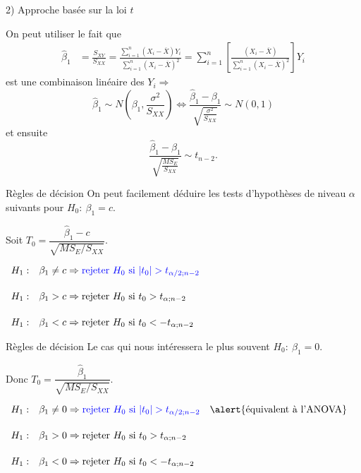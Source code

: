 \documentclass{BeamerTemplate}
\begin{document}
\begin{frame}[t]{2) Approche basée sur la loi $t$}

{\small
On peut utiliser le fait que
\begin{align*}
\hat{\beta}_1&=\frac{S_{XY}}{S_{XX}}=\frac{\sum_{i=1}^n(X_i-\overline{X})Y_i}{\sum_{i=1}^n(X_i-\overline{X})^2}
=\sum_{i=1}^n\left[\frac{(X_i-\overline{X})}{\sum_{i=1}^n(X_i-\overline{X})^2}\right]Y_i
\end{align*}
est une combinaison linéaire des $Y_i\Rightarrow$
$$
\hat{\beta}_1\sim N\left(\beta_1,\frac{\sigma^2}{S_{XX}}\right)\Leftrightarrow
\frac{\hat{\beta}_1-\beta_1}{\sqrt{\frac{\sigma^2}{S_{XX}}}}\sim N(0,1)
$$
et ensuite
\alert{$$
\frac{\hat{\beta}_1-\beta_1}{\sqrt{\frac{MS_E}{S_{XX}}}}\sim t_{n-2}.
$$}

}
\end{frame}

\begin{frame}[t]{Règles de décision}
On peut facilement déduire les tests
d'hypothèses de niveau $\alpha$ suivants pour $H_0:~\beta_1=c$.
\medskip

Soit $T_0=\dfrac{\hat{\beta}_1-c}{\sqrt{MS_E/S_{XX}}}$.

\bigskip
$\begin{array}{llr}
H_1:&\beta_1\neq c\Rightarrow{\color{blue}{\text{rejeter $H_0$ si\ }|t_0|>t_{\alpha/2;n-2}}}& \\[5mm]
H_1:&\beta_1> c\Rightarrow\text{rejeter $H_0$ si\ }t_0>t_{\alpha;n-2}&\\[5mm]
H_1:&\beta_1< c\Rightarrow\text{rejeter $H_0$ si\ }t_0<-t_{\alpha;n-2}&
\end{array}$

\end{frame}

\begin{frame}[t]{Règles de décision}
Le cas qui nous intéressera le plus souvent $H_0:~\beta_1=0$.
\medskip

Donc $T_0=\dfrac{\hat{\beta}_1}{\sqrt{MS_E/S_{XX}}}$.

\bigskip
$\begin{array}{llr}
H_1:&\beta_1\neq 0\Rightarrow{\color{blue}{\text{rejeter $H_0$ si\ }|t_0|>t_{\alpha/2;n-2}}}& \alert{\text{équivalent à l'ANOVA}}\\[5mm]
H_1:&\beta_1> 0\Rightarrow\text{rejeter $H_0$ si\ }t_0>t_{\alpha;n-2}&\\[5mm]
H_1:&\beta_1< 0\Rightarrow\text{rejeter $H_0$ si\ }t_0<-t_{\alpha;n-2}&
\end{array}$

\end{frame}
\end{document}
